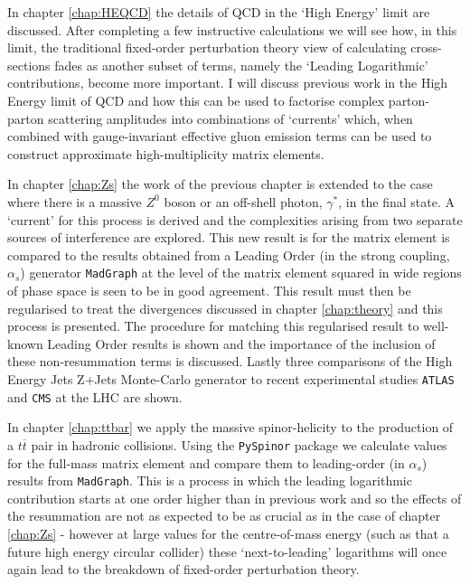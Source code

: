 	In chapter \ref{chap:HEQCD} the details of QCD in the `High Energy' limit are discussed.  After completing a few instructive calculations we will see how,
	in this limit, the traditional fixed-order perturbation theory view of calculating cross-sections fades as another subset of terms, namely the `Leading
	Logarithmic' contributions, become more important.  I will discuss previous work in the High Energy limit of QCD and how this can be used to factorise
	complex parton-parton scattering amplitudes into combinations of `currents' which, when combined with gauge-invariant effective gluon emission terms can be used to
	construct approximate high-multiplicity matrix elements.

	In chapter \ref{chap:Zs} the work of the previous chapter is extended to the case where there is a massive $Z^0$ boson or an off-shell photon, $\gamma^*$,
	in the final state.  A `current' for this process is derived and the complexities arising from two separate sources of interference are explored.
	This new result is for the matrix element is compared to the results obtained from a Leading Order (in the strong coupling, $\alpha_s$) generator
	\texttt{MadGraph} at the level of the matrix element squared in wide regions of phase space is seen to be in good agreement.
	This result must then be regularised to treat the divergences discussed in chapter \ref{chap:theory} and this process is presented.
	The procedure for matching this regularised result to well-known Leading Order results is shown and the importance of the inclusion of these
	non-resummation terms is discussed. Lastly three comparisons of the High Energy Jets Z+Jets Monte-Carlo generator to recent experimental
	studies \texttt{ATLAS} and \texttt{CMS} at the LHC are shown.

	In chapter \ref{chap:ttbar} we apply the massive spinor-helicity to the production of a $t\overline t$ pair in hadronic collisions.  Using the
	\texttt{PySpinor} package we calculate values for the full-mass matrix element and compare them to leading-order (in $\alpha_s$) results from
	\texttt{MadGraph}.  This is a process in which the leading logarithmic contribution starts at one order higher than in previous work and so the effects
	of the resummation are not as expected to be as crucial as in the case of chapter \ref{chap:Zs} - however at large values for the centre-of-mass energy
	(such as that a future high energy circular collider) these `next-to-leading' logarithms will once again lead to the breakdown of fixed-order
	perturbation theory.


